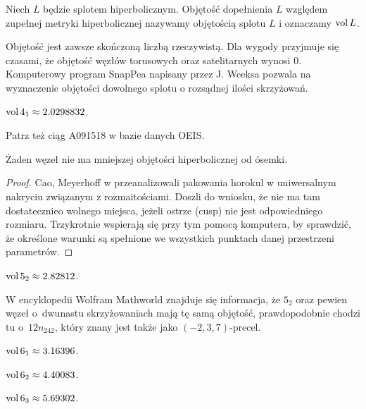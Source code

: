 \begin{definition}[objętość]
    Niech $L$ będzie splotem hiperbolicznym.
    Objętość dopełnienia $L$ względem zupełnej metryki hiperbolicznej nazywamy objętością splotu $L$ i oznaczamy $\operatorname{vol} L$.
\end{definition}

Objętość jest zawsze skończoną liczbą rzeczywistą.
Dla wygody przyjmuje się czasami, że objętość węzłów torusowych oraz satelitarnych wynosi $0$.
Komputerowy program SnapPea napisany przez J. Weeksa pozwala na wyznaczenie objętości dowolnego splotu o rozsądnej ilości skrzyżowań.

\begin{example}
    $\operatorname{vol} 4_1 \approx 2.0298832$.
\end{example}

Patrz też ciąg A091518 w bazie danych OEIS.

\begin{proposition}
    \label{least_volume}
    Żaden węzeł nie ma mniejszej objętości hiperbolicznej od ósemki.
\end{proposition}

\begin{proof}
    Cao, Meyerhoff w \cite{cao01} przeanalizowali pakowania horokul w uniwersalnym nakryciu związanym z rozmaitościami.
    Doszli do wniosku, że nie ma tam dostatecznieo wolnego miejsca, jeżeli ostrze (cusp) nie jest odpowiedniego rozmiaru.
    Trzykrotnie wspierają się przy tym pomocą komputera, by sprawdzić, że określone warunki są spełnione we wszystkich punktach danej przestrzeni parametrów.
\end{proof}

\begin{example}
    $\operatorname{vol} 5_2 \approx 2.82812$.
\end{example}

W encyklopedii Wolfram Mathworld znajduje się informacja, że $5_2$ oraz pewien węzeł o~dwunastu skrzyżowaniach mają tę samą objętość, prawdopodobnie chodzi tu o~$12n_{242}$, który znany jest także jako $(-2, 3, 7)$-precel. 

\begin{example}
    $\operatorname{vol} 6_1 \approx 3.16396$.
\end{example}

\begin{example}
    $\operatorname{vol} 6_2 \approx 4.40083$.
\end{example}

\begin{example}
    $\operatorname{vol} 6_3 \approx 5.69302$.
\end{example}

